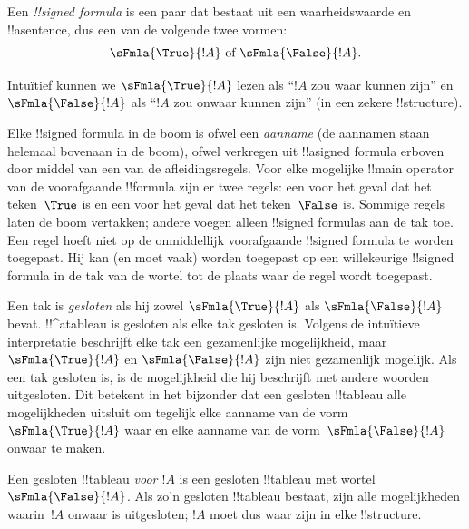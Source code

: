 \documentclass[openany]{memoir}
\begin{document}
\begin{defn}
  Een \emph{!!{signed formula}} is een paar dat bestaat uit een
  waarheidswaarde en !!a{sentence}, dus een van de volgende twee
  vormen:
  \[
  \sFmla{\True}{!A} \text{ of } \sFmla{\False}{!A}.
  \]
\end{defn}

Intuïtief kunnen we $\sFmla{\True}{!A}$ lezen als ``$!A$ zou waar
kunnen zijn'' en $\sFmla{\False}{!A}$ als ``$!A$ zou onwaar kunnen
zijn'' (in een zekere !!{structure}).

Elke !!{signed formula} in de boom is ofwel een \emph{aanname} (de
aannamen staan helemaal bovenaan in de boom), ofwel verkregen uit
!!a{signed formula} erboven door middel van een van de
afleidingsregels. Voor elke mogelijke !!{main operator} van de
voorafgaande !!{formula} zijn er twee regels: een voor het geval dat
het teken~$\True$ is en een voor het geval dat het teken~$\False$ is.
Sommige regels laten de boom vertakken; andere voegen alleen
!!{signed formula}s aan de tak toe. Een regel hoeft niet op de
onmiddellijk voorafgaande !!{signed formula} te worden toegepast. Hij
kan (en moet vaak) worden toegepast op een willekeurige !!{signed
formula} in de tak van de wortel tot de plaats waar de regel wordt
toegepast.

Een tak is \emph{gesloten} als hij zowel $\sFmla{\True}{!A}$ als
$\sFmla{\False}{!A}$ bevat. !!^a{tableau} is gesloten als elke tak
gesloten is. Volgens de intuïtieve interpretatie beschrijft elke tak
een gezamenlijke mogelijkheid, maar $\sFmla{\True}{!A}$ en
$\sFmla{\False}{!A}$ zijn niet gezamenlijk mogelijk. Als een tak
gesloten is, is de mogelijkheid die hij beschrijft met andere woorden
uitgesloten. Dit betekent in het bijzonder dat een gesloten
!!{tableau} alle mogelijkheden uitsluit om tegelijk elke aanname van
de vorm $\sFmla{\True}{!A}$ waar en elke aanname van de
vorm~$\sFmla{\False}{!A}$ onwaar te maken.

Een gesloten !!{tableau} \emph{voor $!A$} is een gesloten
!!{tableau} met wortel~$\sFmla{\False}{!A}$. Als zo'n gesloten
!!{tableau} bestaat, zijn alle mogelijkheden waarin~$!A$ onwaar is
uitgesloten; $!A$ moet dus waar zijn in elke !!{structure}.
\endgroup

\begingroup
\def\olfilename{OLP-0100}
\def\olfilepath{content/first-order-logic/tableaux/}
\hypertarget{unit-OLP-0100}{}
\end{document}
